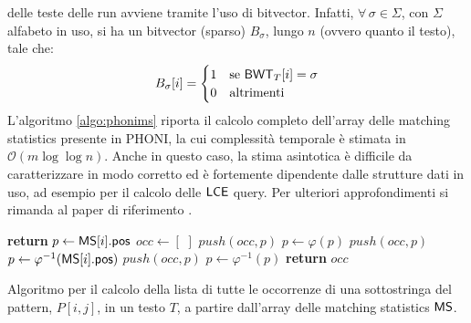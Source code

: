 delle teste delle run avviene tramite l'uso di bitvector. Infatti,
$\forall\, \sigma \in \Sigma$, con $\Sigma$ alfabeto in uso, si ha un
bitvector (sparso) $B_{\sigma}$, lungo $n$ (ovvero quanto il testo), tale che:
\begin{equation}
  \label{eq:rlbwt10}
  B_{\sigma}[i]=
  \begin{cases}
    1&\mbox{se } \mbox{\rm {\sf BWT}}_T[i]=\sigma\\
    0&\mbox{altrimenti}
  \end{cases}
\end{equation}
L'algoritmo \ref{algo:phonims} \cite{phoni}
riporta il calcolo completo dell'array delle matching statistics presente in
PHONI, la cui 
complessità temporale è stimata in $\mathcal{O}(m\log\log n)$.
Anche in questo caso, la stima asintotica è difficile da caratterizzare in modo 
corretto ed è fortemente dipendente dalle strutture dati in uso, ad esempio 
per il calcolo delle $\mbox{\rm {\sf LCE}}$ query.
Per ulteriori approfondimenti si rimanda al paper di riferimento
\cite{phoni}.
\begin{algorithm}
  \small
  \begin{algorithmic}[1]
    \State \textbf{return}
    \EndIf
    \State $p\gets \mbox{\rm {\sf MS}}[i].\mbox{\rm {\sf pos}}$
    \State $occ\gets [\,\,]$
    \State $push(occ, p)$
    \State $p\gets \varphi(p)$
    \State $push(occ, p)$
    \EndWhile
    \State $p\gets \varphi^{-1}(\mbox{\rm {\sf MS}}[i].\mbox{\rm {\sf pos}})$
    \State $push(occ, p)$
    \State $p\gets \varphi^{-1}(p)$
    \EndWhile
    \State \textbf{return} $occ$
    \EndFunction
  \end{algorithmic}
  \caption{Algoritmo per il calcolo della lista di tutte le occorrenze di una
  sottostringa del pattern, $P[i,j]$, in un testo $T$, a partire dall'array
  delle matching statistics $\mbox{\rm {\sf MS}}$.}
  \label{algo:expand}
\end{algorithm}

